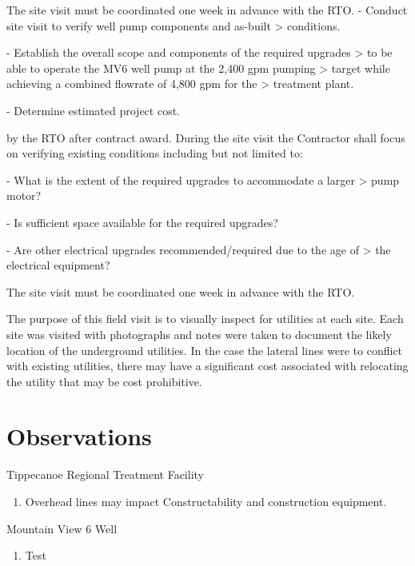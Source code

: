 \documentclass{article}
\newenvironment{pres}[2]{%
  \large{#2}
  \smallskip
}
{
  \goodbreak
  \smallskip
}
\begin{document}
The site visit must be coordinated one week in advance with the RTO.
-   Conduct site visit to verify well pump components and as-built
    > conditions.

-   Establish the overall scope and components of the required upgrades
    > to be able to operate the MV6 well pump at the 2,400 gpm pumping
    > target while achieving a combined flowrate of 4,800 gpm for the
    > treatment plant.

-   Determine estimated project cost.

by the RTO after contract award. During the site visit the Contractor
shall focus on verifying existing conditions including but not limited
to:

-   What is the extent of the required upgrades to accommodate a larger
    > pump motor?

-   Is sufficient space available for the required upgrades?

-   Are other electrical upgrades recommended/required due to the age of
    > the electrical equipment?

The site visit must be coordinated one week in advance with the RTO.

The purpose of this field visit is to visually inspect for utilities at each
site.  Each site was visited with photographs and notes were taken to document
the likely location of the underground utilities.  In the case the lateral lines
were to conflict with existing utilities, there may have a significant cost
associated with relocating the utility that may be cost prohibitive.

\section*{Observations}
\begin{pres}{}{Tippecanoe Regional Treatment Facility}
  \begin{enumerate}[noitemsep]
      \item Overhead lines may impact Constructability and construction equipment.
  \end{enumerate}

\end{pres}

\begin{pres}{}{Mountain View 6 Well}
  \begin{enumerate}[noitemsep]
      \item Test
  \end{enumerate}

\end{pres}

\newpage


\end{document}
